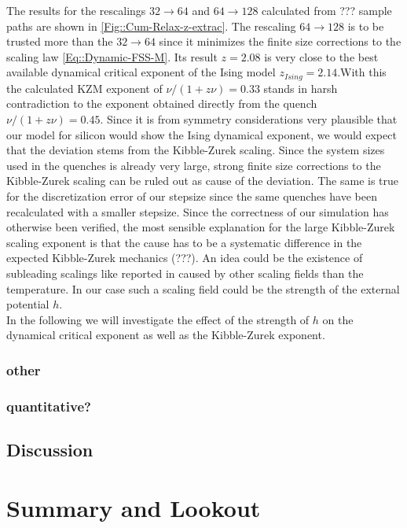 		The results for the rescalings $32 \rightarrow 64$ and $64 \rightarrow 128$ calculated from ??? sample paths are shown in \autoref{Fig::Cum-Relax-z-extrac}. The rescaling $64 \rightarrow 128$ is to be trusted more than the $32 \rightarrow 64$ since it minimizes the finite size corrections to the scaling law \autoref{Eq::Dynamic-FSS-M}. Its result $z =	2.08$ is very close to the best available dynamical critical exponent of the Ising model $z_{Ising}=2.14$.With this the calculated KZM exponent of $\nu /	(1 + z\nu) = 0.33	$ stands in harsh contradiction to the exponent obtained directly from the quench $\nu /	(1 + z\nu) = 0.45$. Since it is from symmetry considerations very plausible that our model for silicon would show the Ising dynamical exponent, we would expect that the deviation stems from the Kibble-Zurek scaling. Since the system sizes used in the quenches is already very large, strong finite size corrections to the Kibble-Zurek scaling can be ruled out as cause of the deviation. The same is true for the discretization error of our stepsize since the same quenches have been recalculated with a smaller stepsize. Since the correctness of our simulation has otherwise been verified, the most sensible explanation for the large Kibble-Zurek scaling exponent is that the cause has to be a systematic difference in the expected Kibble-Zurek mechanics (???). An idea could be the existence of subleading scalings like reported in \cite{ladewig2020kibble} caused by other scaling fields than the temperature. In our case such a scaling field could be the strength of the external potential $h$. \\
		
		In the following we will investigate the effect of the strength of $h$ on the dynamical critical exponent as well as the Kibble-Zurek exponent.

		\subsection{other}
		\subsection{quantitative?}
	\section{Discussion}
\chapter{Summary and Lookout}

